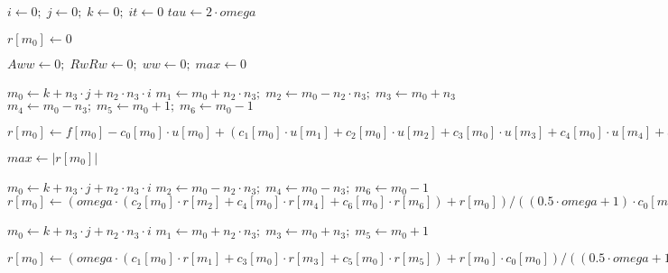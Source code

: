 \documentclass{article}
\begin{document}
 
 
\begin{algorithm}
\caption{mptm(IN: $c_1, c_2, c_3, c_4, c_5, c_6, c_0, f, s, omega, e;$ OUT: $u$)}\label{alg:mptm}
\begin{algorithmic}[1]
 
\State $i \gets 0;\; j \gets 0;\; k \gets 0;\; it \gets 0$
\State $tau \gets 2 \cdot omega$

\State $r[m_0] \gets 0$
\EndFor

\Repeat
\State $Aww \gets 0;\; RwRw \gets 0;\; ww \gets 0;\; max \gets 0$

\State $m_0 \gets k + n_3 \cdot j + n_2 \cdot n_3 \cdot i$
\State $m_1 \gets m_0 + n_2 \cdot n_3;\; m_2 \gets m_0 - n_2 \cdot n_3;\; m_3 \gets m_0 + n_3$
\State $m_4 \gets m_0 - n_3;\; m_5 \gets m_0 + 1;\; m_6 \gets m_0 - 1$
\State \parbox[t]{\dimexpr\linewidth-\algorithmicindent-\algorithmicindent-\algorithmicindent-\algorithmicindent-\algorithmicindent}{$r[m_0] \gets f[m_0] - c_0[m_0] \cdot u[m_0] + (c_1[m_0] \cdot u[m_1] + c_2[m_0] \cdot u[m_2] + c_3[m_0] \cdot u[m_3] + c_4[m_0] \cdot u[m_4] + c_5[m_0] \cdot u[m_5] + c_6[m_0] \cdot u[m_6])$}
\State $max \gets |r[m_0]|$
\EndIf
\EndIf
\EndFor
\EndFor
\EndFor

\State $m_0 \gets k + n_3 \cdot j + n_2 \cdot n_3 \cdot i$
\State $m_2 \gets m_0 - n_2 \cdot n_3;\; m_4 \gets m_0 - n_3;\; m_6 \gets m_0 - 1$
\State $r[m_0] \gets (omega \cdot (c_2[m_0] \cdot r[m_2] + c_4[m_0] \cdot r[m_4] + c_6[m_0] \cdot r[m_6]) + r[m_0]) / ((0.5 \cdot omega + 1) \cdot c_0[m_0]) $
\EndIf
\EndFor
\EndFor
\EndFor

\State $m_0 \gets k + n_3 \cdot j + n_2 \cdot n_3 \cdot i$
\State $m_1 \gets m_0 + n_2 \cdot n_3;\; m_3 \gets m_0 + n_3;\; m_5 \gets m_0 + 1$
\State \parbox[t]{\dimexpr\linewidth-\algorithmicindent-\algorithmicindent-\algorithmicindent-\algorithmicindent-\algorithmicindent}{$r[m_0] \gets (omega \cdot (c_1[m_0] \cdot r[m_1] + c_3[m_0] \cdot r[m_3] + c_5[m_0] \cdot r[m_5]) + r[m_0] \cdot c_0[m_0]) / ((0.5 \cdot omega + 1) \cdot c_0[m_0]) $}
\EndIf
\EndFor
\EndFor
\EndFor


\end{algorithmic}
\end{algorithm}
\end{document}

